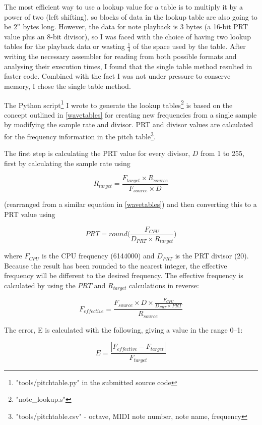 The most efficient way to use a lookup value for a table is to multiply it by a power of two (left 
shifting), so blocks of data in the lookup table are also going to be $2^n$ bytes long.  However, 
the data for note playback is 3 bytes (a 16-bit PRT value plus an 8-bit divisor), so I was faced 
with the choice of having two lookup tables for the playback data or wasting $\frac{1}{4}$ of the 
space used by the table.  After writing the necessary assembler for reading from both possible 
formats and analysing their execution times, I found that the single table method resulted in faster 
code.  Combined with the fact I was not under pressure to conserve memory, I chose the single table 
method.

The Python script\footnote{"tools/pitchtable.py" in the submitted source code} I wrote to generate 
the lookup tables\footnote{"note\_lookup.s"} is based on the concept outlined in \ref{wavetables} 
for creating new frequencies from a single sample by modifying the sample rate and divisor.  PRT and 
divisor values are calculated for the frequency information in the pitch 
table\footnote{"tools/pitchtable.csv" - octave, MIDI note number, note name, frequency}.

The first step is calculating the PRT value for every divisor, $D$ from 1 to 255, first by 
calculating the sample rate using

\[R_{target} = \frac{F_{target} \times R_{source}}{F_{source} \times D}\]

(rearranged from a similar equation in \ref{wavetables}) and then converting this to a PRT value 
using

\[PRT = round\big(\frac{F_{CPU}}{D_{PRT}\times{}R_{target}}\big)\]

where $F_{CPU}$ is the CPU frequency (6144000) and $D_{PRT}$ is the PRT divisor (20).  Because the 
result has been rounded to the nearest integer, the effective frequency will be different to the 
desired frequency.  The effective frequency is calculated by using the $PRT$ and $R_{target}$ 
calculations in reverse:

\[F_{effective} = \frac{F_{source}\times{}D\times{}\frac{F_{CPU}}{D_{PRT}\times{}PRT}}{R_{source}}\]

The error, E is calculated with the following, giving a value in the range 0--1:

\[E = \frac{|F_{effective} - F_{target}|}{F_{target}}\]

